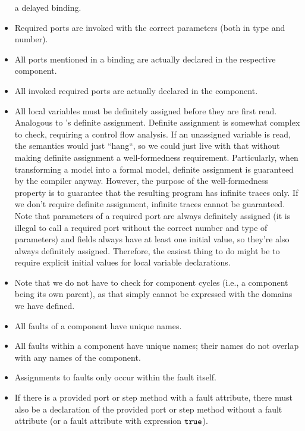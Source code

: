 \documentclass[a4paper,10pt,english]{article}
\begin{document}
\begin{itemize}
	a delayed binding.
	\item Required ports are invoked with the correct parameters (both in type and number).
	\item All ports mentioned in a binding are actually declared in the respective component.
	\item All invoked required ports are actually declared in the component.
	\item All local variables must be definitely assigned before they are first read. Analogous to \CSharp's definite assignment.
	Definite assignment is somewhat complex to check, requiring a control flow analysis. If an unassigned variable is read, the
	semantics would just ``hang``, so we could just live with that without making definite assignment a well-formedness requirement.
	Particularly, when transforming a \SSharp model into a formal model, definite assignment is guaranteed by the \CSharp compiler
	anyway. However, the purpose of the well-formedness property is to guarantee that the resulting \Fil program
	has infinite traces only. If we don't require definite assignment, infinite traces cannot be guaranteed. Note that parameters
	of a required port are always definitely assigned (it is illegal to call a required port without the correct number and type of
	parameters) and fields always have at least one initial value, so they're also always definitely assigned. Therefore, the easiest thing to do might be to require explicit initial values for
	local variable declarations.
	\item Note that we do not have to check for component cycles (i.e., a component being its own parent), as that simply cannot be
	expressed with the domains we have defined.
	\item All faults of a component have unique names.
	\item All faults within a component have unique names; their names do not overlap with any names of the component.
	\item Assignments to faults only occur within the fault itself.
	\item If there is a provided port or step method with a fault attribute, there must also be a declaration of the provided port or
	step method without a fault attribute (or a fault attribute with expression $\texttt{true}$).
\end{itemize}
\end{document}

